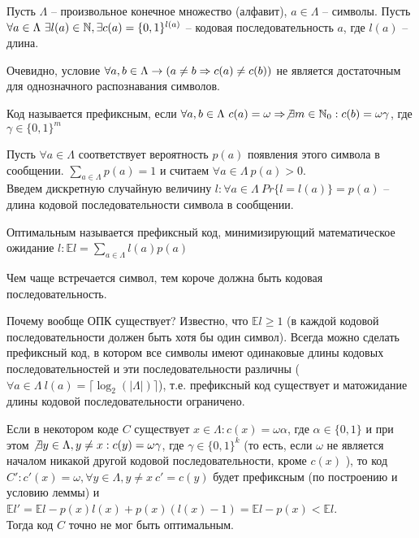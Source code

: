 


	\Header

	\BeginConspect



	Пусть $\Lambda$ -- произвольное конечное множество (алфавит), $a \in \Lambda$ -- символы. 
	Пусть $\forall a \in \Lambda \ \exists l(a) \in \N, \exists c(a) = \{0, 1\}^{l(a)}$ -- кодовая последовательность $a$, где $l(a)$ -- длина. 

	Очевидно, условие $\forall a, b \in \Lambda \to (a \neq b \Rightarrow c(a) \neq c(b))$ не является достаточным для однозначного распознавания символов.

	\begin{Def}
		Код называется префиксным, если $\forall a, b \in \Lambda \ c(a) = \omega \Rightarrow \not\exists m \in \mathbb{N}_0 : c(b) = \omega \gamma$, где $\gamma \in \{0, 1\}^m$  
	\end{Def}

	Пусть $\forall a \in \Lambda$ соответствует вероятность $p(a)$ появления этого символа в сообщении. $\sum_{a \in \Lambda} p(a) = 1$ и считаем $\forall a \in \Lambda \ p(a) > 0$. \\
	Введем дискретную случайную величину $l : \forall a \in \Lambda \ Pr\{l = l(a)\} = p(a)$ -- длина кодовой последовательности символа в сообщении.

	\begin{Def}
		Оптимальным называется префиксный код, минимизирующий математическое ожидание $l : \mathbb{E} l = \sum_{a \in \Lambda} l(a)p(a)$ 
	\end{Def}

	Чем чаще встречается символ, тем короче должна быть кодовая последовательность.

	Почему вообще ОПК существует? Известно, что $\mathbb{E} l \geqslant 1$ (в каждой кодовой последовательности должен быть хотя бы один символ).
	Всегда можно сделать префиксный код, в котором все символы имеют одинаковые длины кодовых последовательностей и эти последовательности различны
	($\forall a \in \Lambda \ l(a) = \lceil\log_2 (|\Lambda|)\rceil$), т.е. префиксный код существует и матожидание длины кодовой последовательности ограничено.

	\begin{Lm}
		Если в некотором коде $C$ существует $x \in \Lambda : c(x) = \omega \alpha$, где $\alpha \in \{0, 1\}$ и при этом $\not\exists y \in \Lambda, y \neq x : c(y) = \omega \gamma$, где $\gamma \in \{0, 1\}^k$ (то есть, если $\omega$ не является началом никакой другой кодовой последовательности, кроме $c(x)$ ),
		то код $C' : c'(x) = \omega, \forall y \in \Lambda, y \neq x \ c' = c(y)$ будет префиксным (по построению и условию леммы) и 
		$\mathbb{E}l' = \mathbb{E}l - p(x)l(x) + p(x)(l(x) - 1) = \mathbb{E} l - p(x) < \mathbb{E} l$. \\ 
		Тогда код $C$ точно не мог быть оптимальным.
	\end{Lm}

